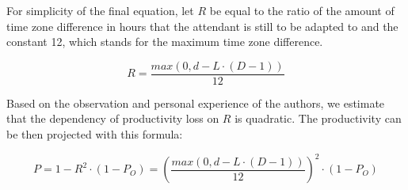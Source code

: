 For simplicity of the final equation, let $R$ be equal to the ratio of the amount of time zone difference in hours that the attendant is still to be adapted to and the constant 12, which stands for the maximum time zone difference.

$$R = \frac{max(0, d - L \cdot (D - 1))}{12}$$

Based on the observation and personal experience of the authors, we estimate that the dependency of productivity loss on $R$ is quadratic. The productivity can be then projected with this formula:
% 
% 

$$P = 1 - R ^ 2 \cdot (1 - P_O) = \left( \frac{max(0, d - L \cdot (D - 1))}{12} \right) ^ 2 \cdot (1 - P_O) $$